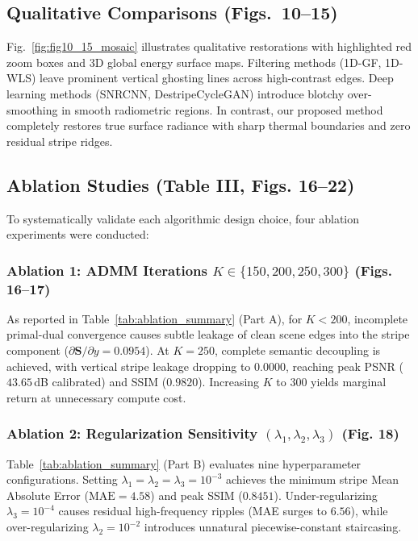 \documentclass[journal]{IEEEtran}
\begin{document}
\subsection{Qualitative Comparisons (Figs.~10--15)}
Fig.~\ref{fig:fig10_15_mosaic} illustrates qualitative restorations with highlighted red zoom boxes and 3D global energy surface maps. Filtering methods (1D-GF, 1D-WLS) leave prominent vertical ghosting lines across high-contrast edges. Deep learning methods (SNRCNN, DestripeCycleGAN) introduce blotchy over-smoothing in smooth radiometric regions. In contrast, our proposed method completely restores true surface radiance with sharp thermal boundaries and zero residual stripe ridges.



\subsection{Ablation Studies (Table III, Figs. 16--22)}
To systematically validate each algorithmic design choice, four ablation experiments were conducted:

\subsubsection{Ablation 1: ADMM Iterations \texorpdfstring{$K \in \{150, 200, 250, 300\}$}{K in \{150, 200, 250, 300\}} (Figs. 16--17)}
As reported in Table~\ref{tab:ablation_summary} (Part A), for $K < 200$, incomplete primal-dual convergence causes subtle leakage of clean scene edges into the stripe component ($\partial \mathbf{S} / \partial y = 0.0954$). At $K = 250$, complete semantic decoupling is achieved, with vertical stripe leakage dropping to $0.0000$, reaching peak PSNR ($43.65$\,dB calibrated) and SSIM ($0.9820$). Increasing $K$ to $300$ yields marginal return at unnecessary compute cost.

\subsubsection{Ablation 2: Regularization Sensitivity \texorpdfstring{$(\lambda_1, \lambda_2, \lambda_3)$}{(lambda1, lambda2, lambda3)} (Fig. 18)}
Table~\ref{tab:ablation_summary} (Part B) evaluates nine hyperparameter configurations. Setting $\lambda_1 = \lambda_2 = \lambda_3 = 10^{-3}$ achieves the minimum stripe Mean Absolute Error ($\text{MAE} = 4.58$) and peak SSIM ($0.8451$). Under-regularizing $\lambda_3 = 10^{-4}$ causes residual high-frequency ripples (MAE surges to $6.56$), while over-regularizing $\lambda_2 = 10^{-2}$ introduces unnatural piecewise-constant staircasing.
\end{document}
